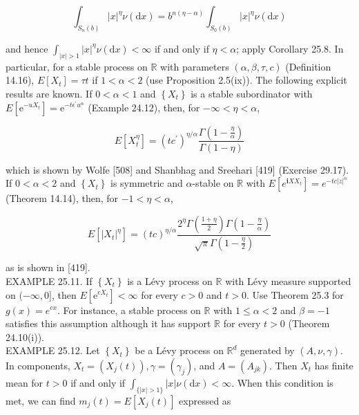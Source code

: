 \documentclass[a4paper,11pt]{article}
\begin{document}
$$
    \int_{S_{n}(b)}|x|^{\eta} \nu(\mathrm{d} x)=b^{n(\eta-\alpha)} \int_{S_{0}(b)}|x|^{\eta} \nu(\mathrm{d} x)
$$

and hence $\int_{|x|>1}|x|^{\eta} \nu(\mathrm{d} x)<\infty$ if and only if $\eta<\alpha$; apply
Corollary 25.8. In particular, for a stable process on $\mathbb{R}$ with parameters
$(\alpha, \beta, \tau, c)$ (Definition 14.16), $E\left[X_{t}\right]=\tau t$ if
$1<\alpha<2$ (use Proposition 2.5(ix)). The following explicit results are known.
If $0<\alpha<1$ and $\left\{X_{t}\right\}$ is a stable subordinator with
$E\left[\mathrm{e}^{-u X_{t}}\right]=\mathrm{e}^{-t \epsilon^{\prime} u^{\alpha}}$ (Example 24.12),
then, for $-\infty<\eta<\alpha$,

\begin{equation*}
    E\left[X_{t}^{\eta}\right]=\left(t c^{\prime}\right)^{\eta / \alpha} \frac{\Gamma\left(1-\frac{\eta}{\alpha}\right)}{\Gamma(1-\eta)} \tag{25.5}
\end{equation*}


which is shown by Wolfe [508] and Shanbhag and Sreehari [419] (Exercise 29.17).
If $0<\alpha<2$ and $\left\{X_{t}\right\}$ is symmetric and $\alpha$-stable on $\mathbb{R}$
with $E\left[e^{\mathbf{i} X X_{t}}\right]=e^{-t c|z|^{\alpha}}$ (Theorem 14.14), then, for $-1<\eta<\alpha$,

\begin{equation*}
    E\left[\left|X_{t}\right|^{\eta}\right]=(t c)^{\eta / \alpha} \frac{2^{\eta} \Gamma\left(\frac{1+\eta}{2}\right) \Gamma\left(1-\frac{\eta}{\alpha}\right)}{\sqrt{\pi} \Gamma\left(1-\frac{\eta}{2}\right)} \tag{25.6}
\end{equation*}

as is shown in [419]. \\

EXAMPLE 25.11. If $\left\{X_{t}\right\}$ is a Lévy process on $\mathbb{R}$ with Lévy
measure supported on $(-\infty, 0]$, then $E\left[\mathrm{e}^{c X_{t}}\right]<\infty$
for every $c>0$ and $t>0$. Use Theorem 25.3 for $g(x)=e^{c x}$. For instance, a stable
process on $\mathbb{R}$ with $1 \leq \alpha<2$ and $\beta=-1$ satisfies this assumption
although it has support $\mathbb{R}$ for every $t>0$ (Theorem 24.10(i)). \\

EXAMPLE 25.12. Let $\left\{X_{t}\right\}$ be a Lévy process on $\mathbb{R}^{d}$ generated
by $(A, \nu, \gamma )$. In components, $X_{t}=\left(X_{j}(t)\right), \gamma=\left(\gamma_{j}\right)$,
and $A=\left(A_{j k}\right)$. Then $X_{t}$ has finite mean for $t>0$
if and only if $\int_{\{|x| >1\}} |x| \nu(\mathrm{d} x)<\infty$.
When this condition is met, we can find $m_{j}(t)=E\left[X_{j}(t)\right]$ expressed as
\end{document}
